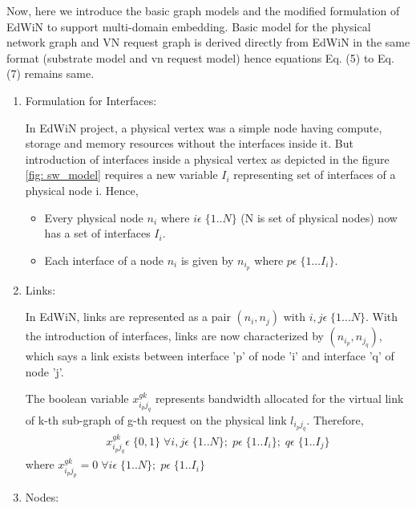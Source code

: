 \documentclass[article,dr=phil,type=msc ,colorback,accentcolor=tud4b]{tudthesis}
\begin{document}
Now, here we introduce the basic graph models and the modified formulation of EdWiN to support multi-domain embedding. Basic model for the physical network graph and VN request graph is derived directly from EdWiN in the same format (substrate model and vn request model) hence equations Eq. (5) to Eq. (7) remains same.

\begin{enumerate}[label=(\Alph*)]
\item  Formulation for Interfaces: 
	
In EdWiN project, a physical vertex was a simple node having compute, storage and memory resources without the interfaces inside it. But introduction of interfaces inside a physical vertex as depicted in the figure \ref{fig: sw_model} requires a new variable $I_{i}$ representing set of interfaces of a physical node i. Hence,
\begin{itemize}
\item Every physical node $n_{i}$ where $i \epsilon\; \{1..N\}$ (N is set of physical nodes) now has a set of interfaces $I_{i}$.
\item Each interface of a node  $n_{i}$ is given by  $n_{i_{p}}$ where  $p \epsilon \; \{1...I_{i}\}$.
\end{itemize}

\item Links:

In EdWiN, links are represented as a pair $(n_{i}, n_{j})$ with $i, j \epsilon \; \{1...N\}$. With the introduction of interfaces, links are now characterized by $(n_{i_{p}}, n_{j_{q}})$, which says a link exists between interface 'p' of node 'i' and interface 'q' of node 'j'.
	
The boolean variable $x^{gk}_{i_{p}j_{q}}$ represents bandwidth allocated for the virtual link of k-th sub-graph of g-th request on the physical link $l_{i_{p}j_{q}}$. Therefore,
\begin{equation}
\begin{split}
x^{gk}_{i_{p}j_{q}} \epsilon \; \{0, 1\} \; \forall i, j \epsilon \;\{1..N\}; \; p \epsilon \;\{1..I_{i}\}; \; q \epsilon \;\{1..I_{j}\}
\end{split}
\end{equation}
where $x^{gk}_{i_{p}j_{p}} = 0 \; \forall i \epsilon \;\{1..N\}; \; p \epsilon \;\{1..I_{i}\}$

\item Nodes: 


\end{enumerate}
\end{document}
